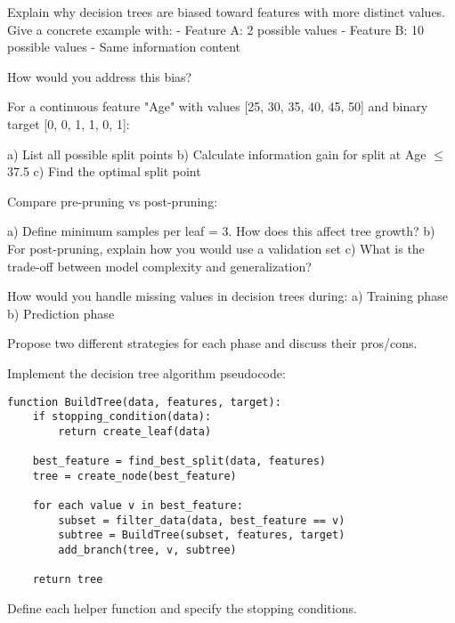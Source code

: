 \documentclass{article}
\newcounter{exercise}
\begin{document}
\begin{tcolorbox}[colback=gray!5!white,colframe=gray!75!black,title=Problem \stepcounter{exercise}: Feature Selection Bias]

Explain why decision trees are biased toward features with more distinct values. Give a concrete example with:
- Feature A: 2 possible values
- Feature B: 10 possible values
- Same information content

How would you address this bias?
\end{tcolorbox}

\begin{tcolorbox}[colback=gray!5!white,colframe=gray!75!black,title=Problem \stepcounter{exercise}: Continuous Feature Splits]

For a continuous feature "Age" with values [25, 30, 35, 40, 45, 50] and binary target [0, 0, 1, 1, 0, 1]:

a) List all possible split points
b) Calculate information gain for split at Age $\leq$ 37.5
c) Find the optimal split point
\end{tcolorbox}

\begin{tcolorbox}[colback=gray!5!white,colframe=gray!75!black,title=Problem \stepcounter{exercise}: Pruning Strategies]

Compare pre-pruning vs post-pruning:

a) Define minimum samples per leaf = 3. How does this affect tree growth?
b) For post-pruning, explain how you would use a validation set
c) What is the trade-off between model complexity and generalization?
\end{tcolorbox}

\begin{tcolorbox}[colback=gray!5!white,colframe=gray!75!black,title=Problem \stepcounter{exercise}: Missing Values]

How would you handle missing values in decision trees during:
a) Training phase
b) Prediction phase

Propose two different strategies for each phase and discuss their pros/cons.
\end{tcolorbox}

\begin{tcolorbox}[colback=gray!5!white,colframe=gray!75!black,title=Problem \stepcounter{exercise}: Implementation Challenge]

Implement the decision tree algorithm pseudocode:

\begin{verbatim}
function BuildTree(data, features, target):
    if stopping_condition(data):
        return create_leaf(data)
    
    best_feature = find_best_split(data, features)
    tree = create_node(best_feature)
    
    for each value v in best_feature:
        subset = filter_data(data, best_feature == v)
        subtree = BuildTree(subset, features, target)
        add_branch(tree, v, subtree)
    
    return tree
\end{verbatim}

Define each helper function and specify the stopping conditions.
\end{tcolorbox}
\end{document}
